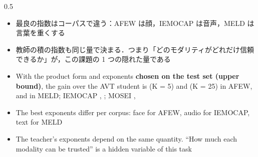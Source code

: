 \begin{frame}{}
\begin{columns}[T]
\begin{column}{0.5\textwidth}
{\begin{itemize}
\item 最良の指数はコーパスで違う：AFEW は顔，IEMOCAP は音声，MELD は言葉を重くする
\item 教師の積の指数も同じ量で決まる．つまり「どのモダリティがどれだけ信頼できるか」が，この課題の 1 つの隠れた量である
\end{itemize}
}{%
\begin{itemize}
\item With the product form and exponents \textbf{chosen on the test set (upper bound)}, the gain over the AVT student is  (K = 5) and  (K = 25) in AFEW,  and  in MELD; IEMOCAP , ; MOSEI , 
\item The best exponents differ per corpus: face for AFEW, audio for IEMOCAP, text for MELD
\item The teacher's exponents depend on the same quantity. ``How much each modality can be trusted'' is a hidden variable of this task
\end{itemize}
}
\end{column}
\end{columns}
{\tiny\color{mMuted}}
\end{frame}

